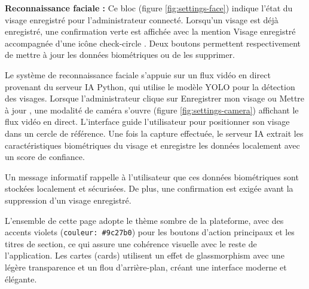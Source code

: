 \medskip

\textbf{Reconnaissance faciale :} Ce bloc (figure \ref{fig:settings-face}) indique l'état du visage enregistré pour l'administrateur connecté. Lorsqu'un visage est déjà enregistré, une confirmation verte est affichée avec la mention \og Visage enregistré \fg{} accompagnée d'une icône \og check-circle \fg{}. Deux boutons permettent respectivement de mettre à jour les données biométriques ou de les supprimer. 

Le système de reconnaissance faciale s'appuie sur un flux vidéo en direct provenant du serveur IA Python, qui utilise le modèle YOLO pour la détection des visages. Lorsque l'administrateur clique sur \og Enregistrer mon visage \fg{} ou \og Mettre à jour \fg{}, une modalité de caméra s'ouvre (figure \ref{fig:settings-camera}) affichant le flux vidéo en direct. L'interface guide l'utilisateur pour positionner son visage dans un cercle de référence. Une fois la capture effectuée, le serveur IA extrait les caractéristiques biométriques du visage et enregistre les données localement avec un score de confiance.

Un message informatif rappelle à l'utilisateur que ces données biométriques sont stockées localement et sécurisées. De plus, une confirmation est exigée avant la suppression d'un visage enregistré.

\medskip

L'ensemble de cette page adopte le thème sombre de la plateforme, avec des accents violets (\texttt{couleur: \#9c27b0}) pour les boutons d'action principaux et les titres de section, ce qui assure une cohérence visuelle avec le reste de l'application. Les cartes (cards) utilisent un effet de glassmorphism avec une légère transparence et un flou d'arrière-plan, créant une interface moderne et élégante.




